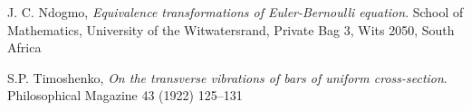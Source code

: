 \begin{thebibliography}{9}

  J. C. Ndogmo,
  \emph{Equivalence transformations of Euler-Bernoulli equation}.
  School of Mathematics, University of the Witwatersrand, Private Bag 3, Wits 2050, South
Africa

  S.P. Timoshenko,
  \emph{On the transverse vibrations of bars of uniform cross-section}.
  Philosophical Magazine 43 (1922) 125–131

\end{thebibliography}